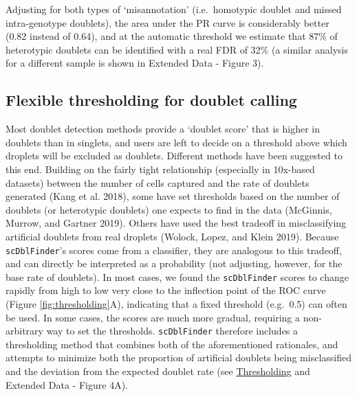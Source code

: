 \documentclass[10pt,a4paper,twocolumn]{article}
\begin{document}
Adjusting for both types of `misannotation' (i.e.~homotypic doublet and missed intra-genotype doublets), the area under the PR curve is considerably better (0.82 instead of 0.64), and at the automatic threshold we estimate that 87\% of heterotypic doublets can be identified with a real FDR of 32\% (a similar analysis for a different sample is shown in Extended Data - Figure 3).

\subsection{Flexible thresholding for doublet calling}

Most doublet detection methods provide a `doublet score' that is higher in doublets than in singlets,
and users are left to decide on a threshold above which droplets will be excluded as doublets.
Different methods have been suggested to this end.
Building on the fairly tight relationship (especially in 10x-based datasets) between the number of cells captured and the rate of doublets generated (Kang et al. 2018), some have set thresholds based on the number of doublets (or heterotypic doublets) one expects to find in the data (McGinnis, Murrow, and Gartner 2019). Others have used the best tradeoff in misclassifying artificial doublets from real droplets (Wolock, Lopez, and Klein 2019).
Because \texttt{scDblFinder}'s scores come from a classifier, they are analogous to this tradeoff, and can directly be interpreted as a probability (not adjusting, however, for the base rate of doublets).
In most cases, we found the \texttt{scDblFinder} scores to change rapidly from high to low very close to the inflection point of the ROC curve (Figure \ref{fig:thresholding}A), indicating that a fixed threshold (e.g.~0.5) can often be used.
In some cases, the scores are much more gradual, requiring a non-arbitrary way to set the thresholds.
\texttt{scDblFinder} therefore includes a thresholding method that combines both of the aforementioned rationales, and attempts to minimize both the proportion of artificial doublets being misclassified and the deviation from the expected doublet rate (see \protect\hyperlink{thresholding}{Thresholding} and Extended Data - Figure 4A).
\end{document}
